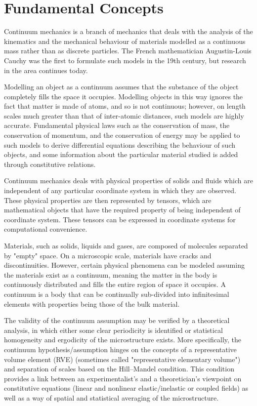 \section {Fundamental Concepts}
Continuum mechanics is a branch of mechanics that deals with the analysis of the kinematics and the mechanical behaviour of materials modelled as a continuous mass rather than as discrete particles. The French mathematician Augustin-Louis Cauchy was the first to formulate such models in the 19th century, but research in the area continues today.

Modelling an object as a continuum assumes that the substance of the object completely fills the space it occupies. Modelling objects in this way ignores the fact that matter is made of atoms, and so is not continuous; however, on length scales much greater than that of inter-atomic distances, such models are highly accurate. Fundamental physical laws such as the conservation of mass, the conservation of momentum, and the conservation of energy may be applied to such models to derive differential equations describing the behaviour of such objects, and some information about the particular material studied is added through constitutive relations.

Continuum mechanics deals with physical properties of solids and fluids which are independent of any particular coordinate system in which they are observed. These physical properties are then represented by tensors, which are mathematical objects that have the required property of being independent of coordinate system. These tensors can be expressed in coordinate systems for computational convenience.

Materials, such as solids, liquids and gases, are composed of molecules separated by "empty" space. On a microscopic scale, materials have cracks and discontinuities. However, certain physical phenomena can be modeled assuming the materials exist as a continuum, meaning the matter in the body is continuously distributed and fills the entire region of space it occupies. A continuum is a body that can be continually sub-divided into infinitesimal elements with properties being those of the bulk material.

The validity of the continuum assumption may be verified by a theoretical analysis, in which either some clear periodicity is identified or statistical homogeneity and ergodicity of the microstructure exists. More specifically, the continuum hypothesis/assumption hinges on the concepts of a representative volume element (RVE) (sometimes called "representative elementary volume") and separation of scales based on the Hill–Mandel condition. This condition provides a link between an experimentalist's and a theoretician's viewpoint on constitutive equations (linear and nonlinear elastic/inelastic or coupled fields) as well as a way of spatial and statistical averaging of the microstructure.\cite{wiki:cm}

